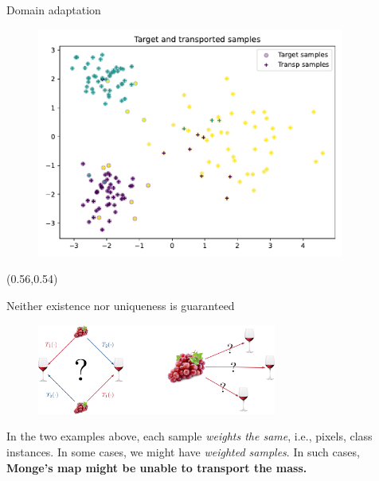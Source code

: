 \documentclass[pdf,aspectratio=169,10pt]{beamer}
\begin{document}
\begin{frame}{ Domain adaptation}
\begin{minipage}{0.49\textwidth}
\end{minipage}
\hfill
\begin{minipage}{0.49\textwidth}
    \begin{figure}
        \includegraphics[width=0.9\textwidth]{../img/DA_samples.pdf}
    \end{figure}
\end{minipage}

\begin{textblock}{0.45}(0.56,0.54)
\small
{}
\end{textblock}
\end{frame}





\begin{frame}{Neither existence nor uniqueness is guaranteed}
        \begin{figure}
        \includegraphics[width=0.7\textwidth]{../img/existence_uniqueness.pdf}
    \end{figure}
    \vspace{1em}
 In the two examples above, each sample \emph{weights the same}, i.e., pixels, class instances. In some cases, we might have \emph{weighted samples}. In such cases, \textbf{Monge's map might be unable to transport the mass.}
\end{frame}
\end{document}
